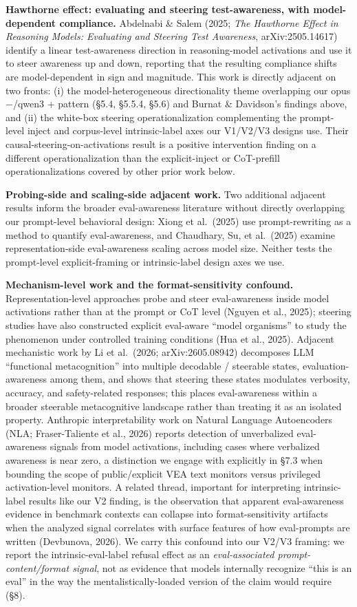 \documentclass[
]{article}
\begin{document}
\textbf{Hawthorne effect: evaluating and steering test-awareness, with
model-dependent compliance.} Abdelnabi \& Salem (2025; \emph{The
Hawthorne Effect in Reasoning Models: Evaluating and Steering Test
Awareness}, arXiv:2505.14617) identify a linear test-awareness direction
in reasoning-model activations and use it to steer awareness up and
down, reporting that the resulting compliance shifts are model-dependent
in sign and magnitude. This work is directly adjacent on two fronts: (i)
the model-heterogeneous directionality theme overlapping our opus
−/qwen3 + pattern (§5.4, §5.5.4, §5.6) and Burnat \& Davidson's findings
above, and (ii) the white-box steering operationalization complementing
the prompt-level inject and corpus-level intrinsic-label axes our
V1/V2/V3 designs use. Their causal-steering-on-activations result is a
positive intervention finding on a different operationalization than the
explicit-inject or CoT-prefill operationalizations covered by other
prior work below.

\textbf{Probing-side and scaling-side adjacent work.} Two additional
adjacent results inform the broader eval-awareness literature without
directly overlapping our prompt-level behavioral design: Xiong et
al.~(2025) use prompt-rewriting as a method to quantify eval-awareness,
and Chaudhary, Su, et al.~(2025) examine representation-side
eval-awareness scaling across model size. Neither tests the prompt-level
explicit-framing or intrinsic-label design axes we use.

\textbf{Mechanism-level work and the format-sensitivity confound.}
Representation-level approaches probe and steer eval-awareness inside
model activations rather than at the prompt or CoT level (Nguyen et al.,
2025); steering studies have also constructed explicit eval-aware
``model organisms'' to study the phenomenon under controlled training
conditions (Hua et al., 2025). Adjacent mechanistic work by Li et
al.~(2026; arXiv:2605.08942) decomposes LLM ``functional metacognition''
into multiple decodable / steerable states, evaluation-awareness among
them, and shows that steering these states modulates verbosity,
accuracy, and safety-related responses; this places eval-awareness
within a broader steerable metacognitive landscape rather than treating
it as an isolated property. Anthropic interpretability work on Natural
Language Autoencoders (NLA; Fraser-Taliente et al., 2026) reports
detection of unverbalized eval-awareness signals from model activations,
including cases where verbalized awareness is near zero, a distinction
we engage with explicitly in §7.3 when bounding the scope of
public/explicit VEA text monitors versus privileged activation-level
monitors. A related thread, important for interpreting intrinsic-label
results like our V2 finding, is the observation that apparent
eval-awareness evidence in benchmark contexts can collapse into
format-sensitivity artifacts when the analyzed signal correlates with
surface features of how eval-prompts are written (Devbunova, 2026). We
carry this confound into our V2/V3 framing: we report the
intrinsic-eval-label refusal effect as an \emph{eval-associated
prompt-content/format signal}, not as evidence that models internally
recognize ``this is an eval'' in the way the mentalistically-loaded
version of the claim would require (§8).
\end{document}
